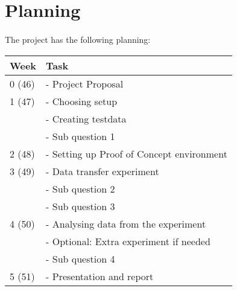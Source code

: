 \section{Planning}
\paragraph{}
The project has the following planning:


\center
\begin{tabular}{ | l| l | } 
\hline 
\textbf{Week} & \textbf{Task} \\
\hline
0 (46) 	& - Project Proposal \\
\hline
1 (47) 	& - Choosing setup \\
    & - Creating testdata \\
    & - Sub question 1 \\
\hline
2 (48)  & - Setting up Proof of Concept environment  \\ 
\hline
3 (49)  & - Data transfer experiment \\
    & - Sub question 2 \\
    & - Sub question 3 \\
\hline
4 (50)  & - Analysing data from the experiment \\
    & - Optional: Extra experiment if needed  \\
    & - Sub question 4 \\ 
\hline
5 (51)  & - Presentation and report \\ 
\hline
\end{tabular}
\label{tab:planning}
\flushleft
